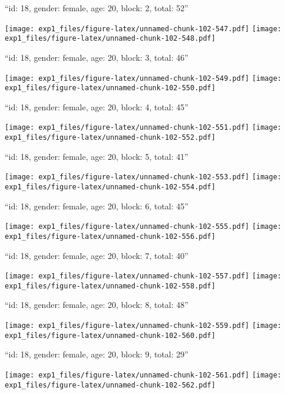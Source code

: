 \documentclass[11pt,,]{article}
\begin{document}
\newpage
[1] 

``id: 18, gender: female, age: 20, block: 2, total: 52''

\texttt{[image: exp1\_files/figure-latex/unnamed-chunk-102-547.pdf]}
\texttt{[image: exp1\_files/figure-latex/unnamed-chunk-102-548.pdf]}

\newpage
[1] 

``id: 18, gender: female, age: 20, block: 3, total: 46''

\texttt{[image: exp1\_files/figure-latex/unnamed-chunk-102-549.pdf]}
\texttt{[image: exp1\_files/figure-latex/unnamed-chunk-102-550.pdf]}

\newpage
[1] 

``id: 18, gender: female, age: 20, block: 4, total: 45''

\texttt{[image: exp1\_files/figure-latex/unnamed-chunk-102-551.pdf]}
\texttt{[image: exp1\_files/figure-latex/unnamed-chunk-102-552.pdf]}

\newpage
[1] 

``id: 18, gender: female, age: 20, block: 5, total: 41''

\texttt{[image: exp1\_files/figure-latex/unnamed-chunk-102-553.pdf]}
\texttt{[image: exp1\_files/figure-latex/unnamed-chunk-102-554.pdf]}

\newpage
[1] 

``id: 18, gender: female, age: 20, block: 6, total: 45''

\texttt{[image: exp1\_files/figure-latex/unnamed-chunk-102-555.pdf]}
\texttt{[image: exp1\_files/figure-latex/unnamed-chunk-102-556.pdf]}

\newpage
[1] 

``id: 18, gender: female, age: 20, block: 7, total: 40''

\texttt{[image: exp1\_files/figure-latex/unnamed-chunk-102-557.pdf]}
\texttt{[image: exp1\_files/figure-latex/unnamed-chunk-102-558.pdf]}

\newpage
[1] 

``id: 18, gender: female, age: 20, block: 8, total: 48''

\texttt{[image: exp1\_files/figure-latex/unnamed-chunk-102-559.pdf]}
\texttt{[image: exp1\_files/figure-latex/unnamed-chunk-102-560.pdf]}

\newpage
[1] 

``id: 18, gender: female, age: 20, block: 9, total: 29''

\texttt{[image: exp1\_files/figure-latex/unnamed-chunk-102-561.pdf]}
\texttt{[image: exp1\_files/figure-latex/unnamed-chunk-102-562.pdf]}
\end{document}
